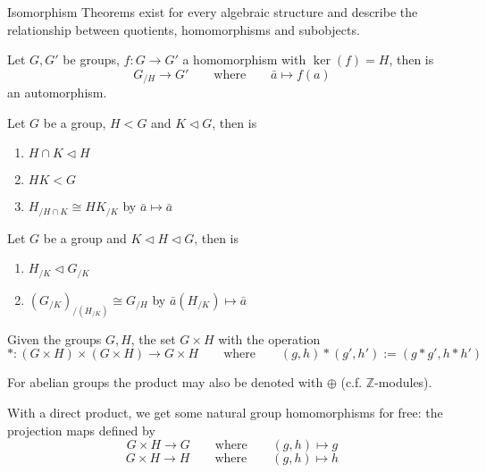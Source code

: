 Isomorphism Theorems exist for every algebraic structure and describe the relationship between quotients, homomorphisms and subobjects.
\begin{proposition}
   Let \(G, G'\) be groups, \(f: G \to G'\) a homomorphism with \(\ker(f) = H\), then is
   \[G_{/H} \to G' \qquad\text{where}\qquad \bar{a} \mapsto f(a)\]
   an automorphism.
\end{proposition}

\begin{proposition}
   Let \(G\) be a group, \(H < G\) and \(K \triangleleft G\), then is
   \begin{enumerate}[label=\roman*, align=Center]
      \item \(H \cap K \triangleleft H\)
      \item \(HK < G\)
      \item \(H_{/H \cap K} \cong HK_{/K}\) by \(\bar{a} \mapsto \bar{a}\)
   \end{enumerate}
\end{proposition}

\begin{proposition}
   Let \(G\) be a group and \(K \triangleleft H \triangleleft G\), then is
   \begin{enumerate}[label=\roman*, align=Center]
      \item \(H_{/K} \triangleleft G_{/K}\)
      \item \((G_{/K})_{/(H_{/K})} \cong G_{/H}\) by \(\bar{a}(H_{/K}) \mapsto \bar{a}\)
   \end{enumerate}
\end{proposition}

\begin{definition}
   Given the groups \(G, H\), the set \(G \times H\) with the operation
   \[\ast: (G \times H) \times (G \times H) \to G \times H \qquad\text{where}\qquad (g, h) \ast (g', h') := (g \ast g', h \ast h')\]
\end{definition}
\begin{remark}[Notation]
   For abelian groups the product may also be denoted with \(\oplus\) (c.f. \(\mathbb{Z}\)-modules).
\end{remark}
\begin{remark}
   With a direct product, we get some natural group homomorphisms for free: the projection maps defined by
   \[G \times H \to G \qquad \text{where}\qquad (g, h) \mapsto g\]
   \[G \times H \to H \qquad \text{where}\qquad (g, h) \mapsto h\]
\end{remark}

